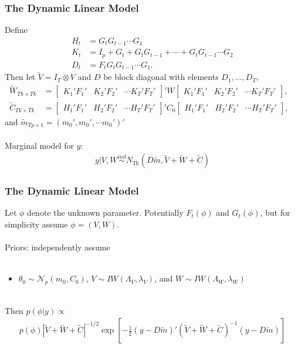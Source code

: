 \documentclass[xcolor=dvipsnames]{beamer}
\newcommand\N{\mathcal{N}}
\begin{document}
\begin{frame}
  \frametitle{The Dynamic Linear Model} 
Define 
\begin{align*}
H_t &= G_tG_{t-1}\cdots G_1\\ 
K_t &= I_p + G_t + G_tG_{t-1} + \cdots + G_tG_{t-1}\cdots G_2\\ 
D_t &= F_tG_tG_{t-1}\cdots G_1.
\end{align*} Then let $\tilde{V}=I_T\otimes V$ and $D$ be block diagonal with elements $D_1,\ldots,D_T$, 
\begin{align*}
\tilde{W}_{Tk\times Tk} &= \begin{bmatrix} K_1'F_1' & K_2'F_2' & \cdots K_T'F_T' \end{bmatrix}' W \begin{bmatrix} K_1'F_1' & K_2'F_2' & \cdots K_T'F_T' \end{bmatrix}, &\\
\tilde{C}_{Tk\times Tk} &= \begin{bmatrix} H_1'F_1' & H_2'F_2' & \cdots H_T'F_T' \end{bmatrix}' C_0 \begin{bmatrix} H_1'F_1' & H_2'F_2' & \cdots H_T'F_T' \end{bmatrix},&
\end{align*}
and $\tilde{m}_{Tp\times 1} = (m_0', m_0', \cdots m_0')'$\\~\\

Marginal model for $y$: 
\begin{align*}
  y|V,W \stackrel{ind}{\sim} N_{Tk}(D\tilde{m}, \tilde{V} + \tilde{W} + \tilde{C})
\end{align*}
\end{frame}

\begin{frame}
  \frametitle{The Dynamic Linear Model} 
Let $\phi$ denote the unknown parameter. Potentially $F_t(\phi)$ and $G_t(\phi)$, but for simplicity assume $\phi=(V,W)$.\\~\\

Priors: independently assume \\~\\
\begin{itemize}
\item[]$\theta_0\sim \N_p(m_0,C_0)$, $V\sim IW(\Lambda_V,\lambda_V)$, and $W\sim IW(\Lambda_W,\lambda_W)$\\~\\
\end{itemize}

Then $p(\phi|y)\propto$
\begin{align*}
p(\phi)|\tilde{V} + \tilde{W} + \tilde{C}|^{-1/2}\exp\left[-\frac{1}{2}\left(y-D\tilde{m}\right)'(\tilde{V} + \tilde{W} + \tilde{C})^{-1}\left(y-D\tilde{m}\right)\right]
\end{align*}
\end{frame}
\end{document}
